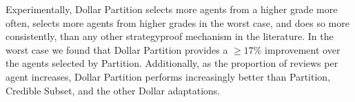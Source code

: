 \documentclass[letterpaper]{article}
\newcommand{\citet}[1]{\citeauthor{#1}~\shortcite{#1}}
\begin{document}
Experimentally, Dollar Partition selects more agents from a higher grade more often, selects more agents from higher grades in the worst case, and does so more consistently, than any other strategyproof mechanism in the literature. In the worst case we found that Dollar Partition provides a $\geq 17\%$ improvement over the agents selected by Partition. Additionally, as the proportion of reviews per agent increases, Dollar Partition performs increasingly better than Partition, Credible Subset, and the other Dollar adaptations.



%

\end{document}
